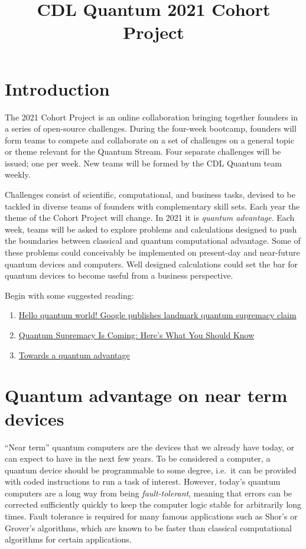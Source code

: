 \documentclass[12pt]{article}
\title{CDL Quantum 2021 Cohort Project}
\begin{document}
\maketitle

\thispagestyle{empty}
\section{Introduction}

The 2021 Cohort Project is an online collaboration bringing together founders in a series of open-source challenges.
During the four-week bootcamp, founders will form teams to compete and collaborate on a set of challenges on a general topic or theme
relevant for the Quantum Stream.  Four separate challenges will be issued; one per week.  New teams will be formed by the CDL Quantum team weekly.

Challenges consist of scientific, computational, and business tasks, devised to be tackled in diverse teams of founders with complementary skill sets.  Each year the theme of the Cohort Project will change.  In 2021 it is {\it quantum advantage}.  
Each week, teams will be asked to explore problems and calculations designed to push the boundaries between classical
and quantum computational advantage.
Some of these problems could conceivably be implemented on present-day and near-future quantum devices and computers.
Well designed calculations could set the bar for quantum devices to become useful from a business perspective.

Begin with some suggested reading:
\begin{enumerate}
\item \href{https://www.nature.com/articles/d41586-019-03213-z}{Hello quantum world! Google publishes landmark quantum supremacy claim}
\item \href{https://physicsworld.com/a/towards-a-quantum-advantage/}{Quantum Supremacy Is Coming: Here's What You Should Know}
\item \href{https://physicsworld.com/a/towards-a-quantum-advantage/}{Towards a quantum advantage}
\end{enumerate}


\section{Quantum advantage on near term devices}

``Near term'' quantum computers are the devices that we already have today, or can expect to have in the next few years.
To be considered a computer, a quantum device should be programmable to some degree, 
i.e.~it can be provided with coded instructions to run a task of interest.
However, today's quantum computers are a long way from being {\it fault-tolerant}, meaning that errors can be corrected sufficiently
quickly to keep the computer logic stable for arbitrarily long times.  Fault tolerance is required for many famous applications such as 
Shor's or Grover's algorithms, which are known to be faster than classical computational algorithms for certain applications.
\end{document}
